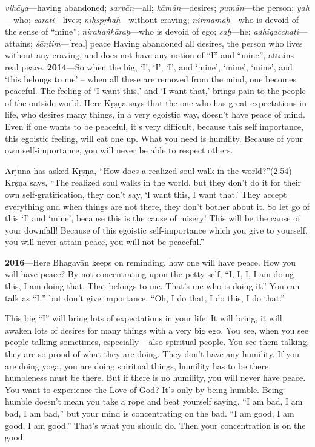 {%
  \textit{vihāya}---having abandoned; 
  \textit{sarvān}---all; 
  \textit{kāmān}---desires; 
  \textit{pumān}---the person; 
  \textit{yaḥ}---who; 
  \textit{carati}---lives; 
  \textit{niḥspṛhaḥ}---without craving; 
  \textit{nirmamaḥ}---who is devoid of the sense of \enquote{mine}; 
  \textit{nirahaṅkāraḥ}---who is devoid of ego; 
  \textit{saḥ}---he; 
  \textit{adhigacchati}---attains; 
  \textit{śāntim}---[real] peace
}
{%
  Having abandoned all desires, the person who lives without any craving, and does not have any notion of \enquote{I} and \enquote{mine}, attains real peace.
}
\textbf{2014}---So when the big, ‘I’, ‘I’, ‘I’, and ‘mine’, ‘mine’, ‘mine’, and ‘this belongs to me’ – when all these are removed from the mind, one becomes peaceful. The feeling of ‘I want this,’ and ‘I want that,’ brings pain to the people of the outside world. Here Kṛṣṇa says that the one who has great expectations in life, who desires many things, in a very egoistic way, doesn’t have peace of mind. Even if one wants to be peaceful, it’s very difficult, because this selfimportance, this egoistic feeling, will eat one up. What you need is humility. Because of your own self-importance, you will never be able to respect others.

Arjuna has asked Kṛṣṇa, “How does a realized soul walk in the world?”(2.54) Kṛṣṇa says, “The realized soul walks in the world, but they don’t do it for their own self-gratification, they don’t say, ‘I want this, I want that.’ They accept everything and when things are not there, they don’t bother about it. So let go of this ‘I’ and ‘mine’, because this is the cause of misery! This will be the cause of your downfall! Because of this egoistic self-importance which you give to yourself, you will never attain peace, you will not be peaceful.”

\textbf{2016}---Here Bhagavān keeps on reminding, how one will have peace. How you will have peace? By not concentrating upon the petty self, “I, I, I, I am doing this, I am doing that. That belongs to me. That’s me who is doing it.” You can talk as “I,” but don’t give importance, “Oh, I do that, I do this, I do that.”

This big “I” will bring lots of expectations in your life. It will bring, it will awaken lots of desires for many things with a very big ego. You see, when you see people talking sometimes, especially – also spiritual people. You see them talking, they are so proud of what they are doing. They don’t have any humility. If you are doing yoga, you are doing spiritual things, humility has to be there, humbleness must be there. But if there is no humility, you will never have peace. You want to experience the Love of God? It’s only by being humble. Being humble doesn’t mean you take a rope and beat yourself saying, “I am bad, I am bad, I am bad,” but your mind is concentrating on the bad. “I am good, I am good, I am good.” That’s what you should do. Then your concentration is on the good.

